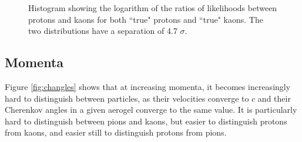 \begin{figure}[]
\centering
{}
\caption[Particle identification separation for 7 GeV kaons and protons]{Histogram showing the logarithm of the ratios of likelihoods between protons and kaons for both ``true" protons and ``true" kaons. The two distributions have a separation of  4.7 $\sigma$.}
\label{fig:kaonprotonsep} 
\end{figure}

\subsection{Momenta}

Figure \ref{fig:changles} shows that at increasing momenta, it becomes increasingly hard to distinguish between particles, as their velocities converge to $c$ and their Cherenkov angles in a given aerogel converge to the same value.
It is particularly hard to distinguish between pions and kaons, but easier to distinguish protons from kaons, and easier still to distinguish protons from pions.

